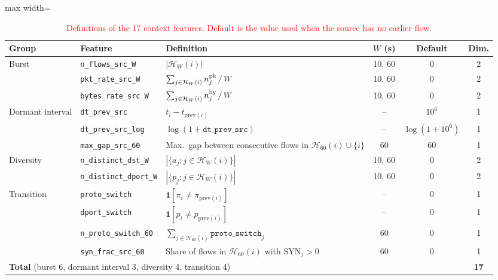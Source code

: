 \documentclass[11pt]{article}
\begin{document}
\setcounter{table}{3}
\begin{table}[H]
\centering
\scriptsize
\caption{\textcolor{red}{Definitions of the 17 context
features. Default is the value used when the source has no earlier
flow.}}

\color{red}
\setlength{\tabcolsep}{6pt}
\renewcommand{\arraystretch}{1.25}
\begin{adjustbox}{max width=\linewidth}
\begin{tabular}{l l >{\raggedright\arraybackslash}p{4.3cm} c c c}
\hline\toprule
\textbf{Group} & \textbf{Feature} & \textbf{Definition} & \textbf{$W$ (s)} & \textbf{Default} & \textbf{Dim.} \\
\hline\toprule
\multirow{3}{*}{Burst}
 & \texttt{n\_flows\_src\_W}    & $|\mathcal{H}_W(i)|$ & 10, 60 & 0 & 2 \\
 & \texttt{pkt\_rate\_src\_W}   & $\sum_{j\in\mathcal{H}_W(i)} n^{\rm pk}_j \,/\, W$ & 10, 60 & 0 & 2 \\
 & \texttt{bytes\_rate\_src\_W} & $\sum_{j\in\mathcal{H}_W(i)} n^{\rm by}_j \,/\, W$ & 10, 60 & 0 & 2 \\
\midrule
\multirow{3}{*}{Dormant interval}
 & \texttt{dt\_prev\_src}     & $t_i-t_{\mathrm{prev}(i)}$ & -- & $10^{6}$ & 1 \\
 & \texttt{dt\_prev\_src\_log} & $\log(1+\texttt{dt\_prev\_src})$ & -- & $\log(1+10^{6})$ & 1 \\
 & \texttt{max\_gap\_src\_60}  & Max.\ gap between consecutive flows in $\mathcal{H}_{60}(i)\cup\{i\}$ & 60 & 60 & 1 \\
\midrule
\multirow{2}{*}{Diversity}
 & \texttt{n\_distinct\_dst\_W}   & $|\{a_j: j\in\mathcal{H}_W(i)\}|$ & 10, 60 & 0 & 2 \\
 & \texttt{n\_distinct\_dport\_W} & $|\{p_j: j\in\mathcal{H}_W(i)\}|$ & 10, 60 & 0 & 2 \\
\midrule
\multirow{4}{*}{Transition}
 & \texttt{proto\_switch}       & $\mathbf{1}[\pi_i\neq\pi_{\mathrm{prev}(i)}]$ & -- & 0 & 1 \\
 & \texttt{dport\_switch}       & $\mathbf{1}[p_i\neq p_{\mathrm{prev}(i)}]$ & -- & 0 & 1 \\
 & \texttt{n\_proto\_switch\_60} & $\sum_{j\in\mathcal{H}_{60}(i)} \texttt{proto\_switch}_j$ & 60 & 0 & 1 \\
 & \texttt{syn\_frac\_src\_60}  & Share of flows in $\mathcal{H}_{60}(i)$ with $\mathrm{SYN}_j>0$ & 60 & 0 & 1 \\
\midrule
\multicolumn{5}{l}{\textbf{Total} (burst 6, dormant interval 3, diversity 4, transition 4)} & \textbf{17} \\
\hline\toprule
\end{tabular}
\end{adjustbox}
\end{table}
\end{document}

